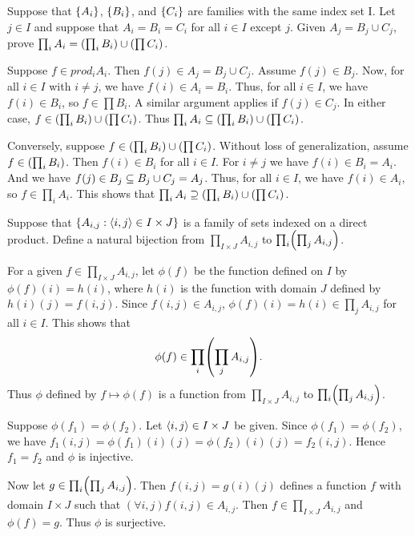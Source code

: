 \documentclass{report}
\begin{document}
\begin{exercise}
Suppose that $\left\{A_i\right\}$, $\left\{B_i\right\}$, and $\left\{C_i\right\}$ are families with the same index set I.
Let $j\in I$ and suppose that $A_i=B_i=C_i$ for all $i\in I$ except $j$. Given
$A_j=B_j\cup C_j$, prove $\prod_i A_i = \left(\prod_i B_i\right) \cup \left(\prod C_i\right)$.
\end{exercise}

\begin{solution}
Suppose $f\in prod_i A_i$. Then $f(j)\in A_j=B_j\cup C_j$. Assume $f(j)\in B_j$.
Now, for all $i\in I$ with $i\neq j$, we have $f(i)\in A_i=B_i$.
Thus, for all $i\in I$, we have $f(i)\in B_i$, so $f\in\prod B_i$.
A similar argument applies if $f(j)\in C_j$.
In either case, $f\in \left(\prod_i B_i\right) \cup \left(\prod C_i\right)$.
Thus $\prod_i A_i \subseteq \left(\prod_i B_i\right) \cup \left(\prod C_i\right)$.

Conversely, suppose $f\in \left(\prod_i B_i\right) \cup \left(\prod C_i\right)$.
Without loss of generalization, assume $f\in \left(\prod_i B_i\right)$.
Then $f(i)\in B_i$ for all $i\in I$.
For $i\neq j$ we have $f(i)\in B_i=A_i$.
And we have $f(j)\in B_j\subseteq B_j\cup C_j = A_j$.
Thus, for all $i\in I$, we have $f(i)\in A_i$, so $f\in \prod_i A_i$.
This shows that $\prod_i A_i \supseteq \left(\prod_i B_i\right) \cup \left(\prod C_i\right)$.
\end{solution}

\begin{exercise}
Suppose that $\left\{ A_{i,j} : \left\langle i,j\right\rangle\in I\times J \right\}$ is a family of sets indexed on
a direct product. Define a natural bijection from $\prod_{I\times J} A_{i,j}$
to $\prod_i\prn{\prod_j A_{i,j}}$.
\end{exercise}

\begin{solution}
For a given $f\in \prod_{I\times J} A_{i,j}$, let $\phi(f)$ be the function defined on $I$
by $\phi(f)(i)=h(i)$, where $h(i)$ is the function with domain $J$ defined
by $h(i)(j)=f(i,j)$.
Since $f(i,j)\in A_{i,j}$, $\phi(f)(i)=h(i)\in \prod_j A_{i,j}$ for all $i\in I$.
This shows that
\[\phi(f)\in\prod_i\prn{\prod_j A_{i,j}}.\]
Thus $\phi$ defined by $f\mapsto \phi(f)$ is a function from $\prod_{I\times J} A_{i,j}$
to $\prod_i\prn{\prod_j A_{i,j}}$.

Suppose $\phi(f_1)=\phi(f_2)$.
Let $\left\langle i,j\right\rangle\in I\times J$ be given.
Since $\phi(f_1)=\phi(f_2)$, we have $f_1(i,j)=\phi(f_1)(i)(j)=\phi(f_2)(i)(j)=f_2(i,j)$.
Hence $f_1=f_2$ and $\phi$ is injective.

Now let $g\in \prod_i\prn{\prod_j A_{i,j}}$.
Then $f(i,j)=g(i)(j)$ defines a function $f$ with domain $I\times J$ such that $(\forall i,j)f(i,j)\in A_{i,j}$.
Then $f\in \prod_{I\times J} A_{i,j}$ and $\phi(f)=g$.
Thus $\phi$ is surjective.
\end{solution}
\end{document}
